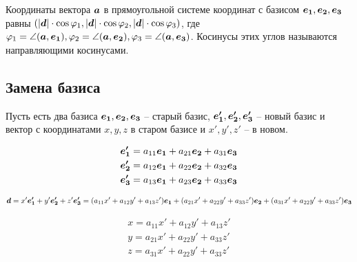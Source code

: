 
Координаты вектора $\bm{a}$ в прямоугольной системе координат с базисом $\bm{e_1}, \bm{e_2}, \bm{e_3}$ равны $(\left\lvert \bm{d} \right\rvert \cdot \cos{\varphi_1}, \left\lvert \bm{d} \right\rvert \cdot \cos{\varphi_2}, \left\lvert \bm{d} \right\rvert \cdot \cos{\varphi_3})$, где $\varphi_1 = \angle(\bm{a}, \bm{e_1}), \varphi_2 = \angle(\bm{a}, \bm{e_2}), \varphi_3 = \angle(\bm{a}, \bm{e_3})$. Косинусы этих углов называются направляющими косинусами.


\subsection{Замена базиса}
Пусть есть два базиса $\bm{e_1}, \bm{e_2}, \bm{e_3}$ -- старый базис, $\bm{e'_1}, \bm{e'_2}, \bm{e'_3}$ -- новый базис и вектор с координатами $x, y, z$ в старом базисе и $x', y', z'$ -- в новом.

\begin{gather*}
    \bm{e'_1} = a_{11} \bm{e_1} + a_{21} \bm{e_2} + a_{31} \bm{e_3} \\    
    \bm{e'_2} = a_{12} \bm{e_1} + a_{22} \bm{e_2} + a_{32} \bm{e_3} \\    
    \bm{e'_3} = a_{13} \bm{e_1} + a_{23} \bm{e_2} + a_{33} \bm{e_3}    
\end{gather*}

\begin{multline*}
    \bm{d} = x' \bm{e'_1} + y' \bm{e'_2} + z' \bm{e'_3} =
        (a_{11} x' + a_{12} y' + a_{13} z') \bm{e_1} + 
        (a_{21} x' + a_{22} y' + a_{33} z') \bm{e_2} + 
        (a_{31} x' + a_{22} y' + a_{33} z') \bm{e_3} \\
\end{multline*}

\begin{gather*}
    x = a_{11} x' + a_{12} y' + a_{13} z' \\
    y = a_{21} x' + a_{22} y' + a_{33} z' \\
    z = a_{31} x' + a_{22} y' + a_{33} z'
\end{gather*}

